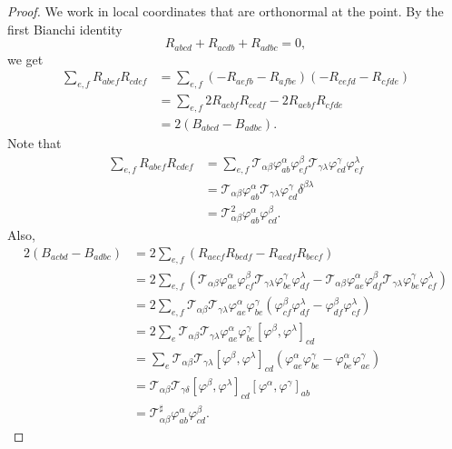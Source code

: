\begin{proof}
We work in local coordinates that are orthonormal at
the point. By the first Bianchi identity $$R_{abcd}+ R_{acdb}+
R_{adbc} = 0,$$ we get
\begin{align*}
\sum_{e,f}R_{abef}R_{cdef} &=
\sum_{e,f}(-R_{aefb}-R_{afbe})(-R_{cefd}-R_{cfde})\\& =
\sum_{e,f}2R_{aebf}R_{cedf}-2R_{aebf}R_{cfde}\\& = 2(B_{abcd} -
B_{adbc}).
\end{align*}
Note that
\begin{align*}
\sum_{e,f}R_{abef}R_{cdef}& =
\sum_{e,f}{\mathcal T}_{\alpha\beta}\varphi^{\alpha}_{ab}\varphi^{\beta}_{ef}
{\mathcal T}_{\gamma\lambda}\varphi^{\gamma}_{cd}\varphi^{\lambda}_{ef}\\
&={\mathcal T}_{\alpha\beta}\varphi^{\alpha}_{ab}{\mathcal
T}_{\gamma\lambda}\varphi^{\gamma}_{cd}\delta^{\beta\lambda}\\& =
{\mathcal
T}^{2}_{\alpha\beta}\varphi^{\alpha}_{ab}\varphi^{\beta}_{cd}.
\end{align*}
Also,
\begin{align*}
2(B_{acbd}-B_{adbc}) &= 2\sum_{e,f}(R_{aecf}R_{bedf} -
R_{aedf}R_{becf})\\& = 2\sum_{e,f}({\mathcal
T}_{\alpha\beta}\varphi^{\alpha}_{ae}\varphi^{\beta}_{cf}{\mathcal
T}_{\gamma\lambda}\varphi^{\gamma}_{be}\varphi^{\lambda}_{df} -
{\mathcal
T}_{\alpha\beta}\varphi^{\alpha}_{ae}\varphi^{\beta}_{df}{\mathcal
T}_{\gamma\lambda}\varphi^{\gamma}_{be}\varphi^{\lambda}_{cf})
\\&=
2\sum_{e,f}{\mathcal T}_{\alpha\beta}{\mathcal
T}_{\gamma\lambda}\varphi^{\alpha}_{ae}\varphi^{\gamma}_{be}(\varphi^{\beta}_{cf}\varphi^{\lambda}_{df}-\varphi^{\beta}_{df}\varphi^{\lambda}_{cf})
\\&=2\sum_e{\mathcal T}_{\alpha\beta}{\mathcal T}_{\gamma\lambda}\varphi^{\alpha}_{ae}
\varphi^{\gamma}_{be}[\varphi^{\beta},\varphi^{\lambda}]_{cd}
\\&=
\sum_e{\mathcal T}_{\alpha\beta}{\mathcal
T}_{\gamma\lambda}[\varphi^{\beta},\varphi^{\lambda}]_{cd}
(\varphi^{\alpha}_{ae}\varphi^{\gamma}_{be}
- \varphi^{\alpha}_{be}\varphi^{\gamma}_{ae})
\\&={\mathcal T}_{\alpha\beta}{\mathcal T}_{\gamma\delta}[\varphi^{\beta},\varphi^{\lambda}]_{cd}[\varphi^{\alpha},\varphi^{\gamma}]_{ab}
\\&=
{\mathcal
T}^{\sharp}_{\alpha\beta}\varphi^{\alpha}_{ab}\varphi^{\beta}_{cd}.
\end{align*}

\end{proof}

